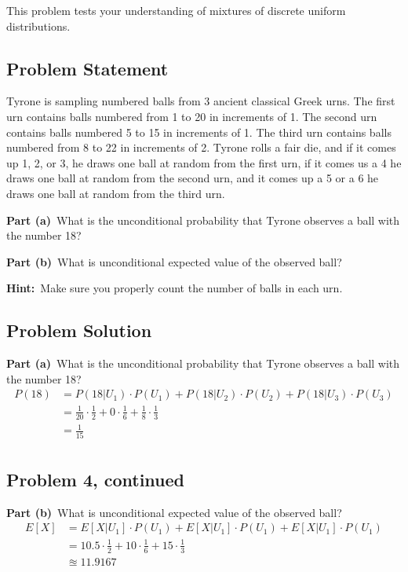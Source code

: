 \documentclass[12pt]{article}
\theoremstyle{definition}
\begin{document}
This problem tests your understanding of mixtures of discrete uniform distributions.

\subsection*{Problem Statement}

Tyrone is sampling numbered balls from 3 ancient classical Greek urns. The first urn contains balls numbered from 1 to 20 in increments of 1. The second urn contains balls numbered 5 to 15 in increments of 1. The third urn contains balls numbered from 8 to 22 in increments of 2. Tyrone rolls a fair die, and if it comes up 1, 2, or 3, he draws one ball at random from the first urn, if it comes us a 4 he draws one ball at random from the second urn, and it comes up a 5 or a 6 he draws one ball at random from the third urn.

\bigskip
\noindent
{\bf Part (a)}\ What is the unconditional probability that Tyrone observes a ball with the number 18?

\bigskip
\noindent
{\bf Part (b)}\ What is unconditional expected value of the observed ball?

\bigskip
\noindent
{\bf Hint:}\ Make sure you properly count the number of balls in each urn.

\subsection*{Problem Solution}

\noindent
{\bf Part (a)}\ What is the unconditional probability that Tyrone observes a ball with the number 18?
\begin{align*}
P(18) &= P(18|U_1)\cdot P(U_1) + P(18|U_2)\cdot P(U_2) + P(18|U_3)\cdot P(U_3)\\
&= \frac{1}{20}\cdot \frac{1}{2} + 0\cdot \frac{1}{6} + \frac{1}{8}\cdot \frac{1}{3}\\
&= \frac{1}{15}\\
\end{align*}




\newpage
\subsection*{Problem 4, continued}

\vspace{2in}
\noindent
{\bf Part (b)}\ What is unconditional expected value of the observed ball?
\begin{align*}
E[X] & = E[X|U_1]\cdot P(U_1) + E[X|U_1]\cdot P(U_1) + E[X|U_1]\cdot P(U_1)\\
&= 10.5\cdot \frac{1}{2} + 10\cdot \frac{1}{6} + 15\cdot \frac{1}{3}\\
&\approxeq 11.9167
\end{align*}
\end{document}
